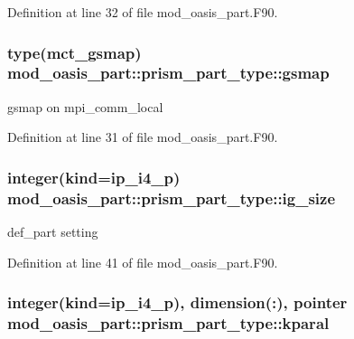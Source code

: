 Definition at line 32 of file mod\+\_\+oasis\+\_\+part.\+F90.

\hypertarget{structmod__oasis__part_1_1prism__part__type_a3d605216cf9bdf556416419ee8ec5993}{
\subsubsection[{gsmap}]{\setlength{\rightskip}{0pt plus 5cm}type(mct\+\_\+gsmap) mod\+\_\+oasis\+\_\+part\+::prism\+\_\+part\+\_\+type\+::gsmap\hspace{0.3cm}{\ttfamily [private]}}}\label{structmod__oasis__part_1_1prism__part__type_a3d605216cf9bdf556416419ee8ec5993}


gsmap on mpi\+\_\+comm\+\_\+local 



Definition at line 31 of file mod\+\_\+oasis\+\_\+part.\+F90.

\hypertarget{structmod__oasis__part_1_1prism__part__type_a68188f6203fd3a54b307f3074cd01957}{
\subsubsection[{ig\+\_\+size}]{\setlength{\rightskip}{0pt plus 5cm}integer(kind=ip\+\_\+i4\+\_\+p) mod\+\_\+oasis\+\_\+part\+::prism\+\_\+part\+\_\+type\+::ig\+\_\+size\hspace{0.3cm}{\ttfamily [private]}}}\label{structmod__oasis__part_1_1prism__part__type_a68188f6203fd3a54b307f3074cd01957}


def\+\_\+part setting 



Definition at line 41 of file mod\+\_\+oasis\+\_\+part.\+F90.

\hypertarget{structmod__oasis__part_1_1prism__part__type_a32de1a0439c69db4f6b4d42839ad4202}{
\subsubsection[{kparal}]{\setlength{\rightskip}{0pt plus 5cm}integer(kind=ip\+\_\+i4\+\_\+p), dimension(\+:), pointer mod\+\_\+oasis\+\_\+part\+::prism\+\_\+part\+\_\+type\+::kparal\hspace{0.3cm}{\ttfamily [private]}}}\label{structmod__oasis__part_1_1prism__part__type_a32de1a0439c69db4f6b4d42839ad4202}


